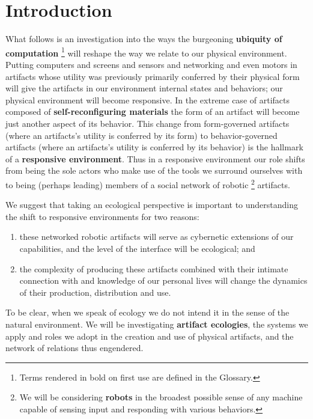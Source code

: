 \chapter{Introduction}
\label{ch:intro}
%
What follows is an investigation into the ways the burgeoning \textbf{ubiquity of computation}%
\footnote{Terms rendered in bold on first use are defined in the Glossary.}%
will reshape the way we relate to our physical environment.
Putting computers and screens and sensors and networking and even motors in artifacts whose utility was previously primarily conferred by their physical form will give the artifacts in our environment internal states and behaviors; our physical environment will become responsive.
In the extreme case of artifacts composed of \textbf{self-reconfiguring materials} the form of an artifact will become just another aspect of its behavior.
This change from form-governed artifacts (where an artifacts's utility is conferred by its form) to behavior-governed artifacts (where an artifacts's utility is conferred by its behavior) is the hallmark of a \textbf{responsive environment}.
Thus in a responsive environment our role shifts from being the sole actors who make use of the tools we surround ourselves with to being (perhaps leading) members of a social network of robotic%
\footnote{We will be considering \textbf{robots} in the broadest possible sense of any machine capable of sensing input and responding with various behaviors.}
artifacts.

We suggest that taking an ecological perspective is important to understanding the shift to responsive environments for two reasons:
\begin{enumerate}
\item these networked robotic artifacts will serve as cybernetic extensions of our capabilities, and the level of the interface will be ecological; and
\item the complexity of producing these artifacts combined with their intimate connection with and knowledge of our personal lives will change the dynamics of their production, distribution and use.
\end{enumerate}
To be clear, when we speak of ecology we do not intend it in the sense of the natural environment.
We will be investigating \textbf{artifact ecologies}, the systems we apply and roles we adopt in the creation and use of physical artifacts, and the network of relations thus engendered.

